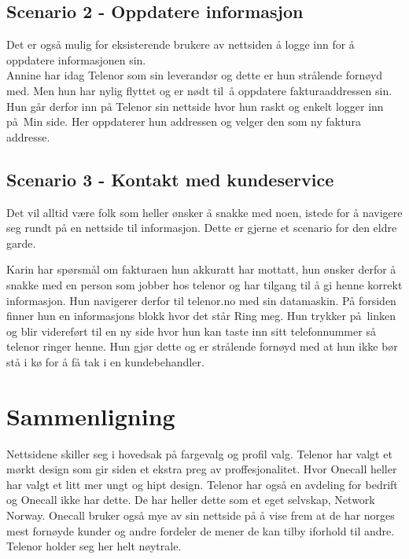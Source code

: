 \documentclass[a4paper, 10pt]{article}
\begin{document}
\subsection*{Scenario 2 - Oppdatere informasjon}
Det er også mulig for eksisterende brukere av nettsiden å logge inn for å oppdatere informasjonen sin.\\

Annine har idag Telenor som sin leverandør og dette er hun strålende fornøyd med. Men hun har nylig flyttet og er nødt til å oppdatere fakturaaddressen sin. Hun går derfor inn på Telenor sin nettside hvor hun raskt og enkelt logger inn på Min side. Her oppdaterer hun addressen og velger den som ny faktura addresse.

\subsection*{Scenario 3 - Kontakt med kundeservice}
Det vil alltid være folk som heller ønsker å snakke med noen, istede for å navigere seg rundt på en nettside til informasjon. Dette er gjerne et scenario for den eldre garde.

Karin har spørsmål om fakturaen hun akkuratt har mottatt, hun ønsker derfor å snakke med en person som jobber hos telenor og har tilgang til å gi henne korrekt informasjon. Hun navigerer derfor til telenor.no med sin datamaskin. På forsiden finner hun en informasjons blokk hvor det står Ring meg. Hun trykker på linken og blir videreført til en ny side hvor hun kan taste inn sitt telefonnummer så telenor ringer henne. Hun gjør dette og er strålende fornøyd med at hun ikke bør stå i kø for å få tak i en kundebehandler.

\section*{Sammenligning}
Nettsidene skiller seg i hovedsak på fargevalg og profil valg. Telenor har valgt et mørkt design som gir siden et ekstra preg av proffesjonalitet. Hvor Onecall heller har valgt et litt mer ungt og hipt design. Telenor har også en avdeling for bedrift og Onecall ikke har dette. De har heller dette som et eget selvskap, Network Norway. Onecall bruker også mye  av sin nettside på å vise frem at de har norges mest fornøyde kunder og andre fordeler de mener de kan tilby iforhold til andre. Telenor holder seg her helt nøytrale. 
\end{document}
